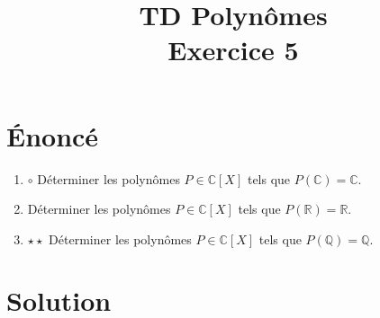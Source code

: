 \documentclass[french]{article}
\title{TD  Polynômes\\ Exercice 5}
\date{}
\newcommand{\Q}{\mathbb{Q}}
\newcommand{\R}{\mathbb{R}}
\newcommand{\C}{\mathbb{C}}
\begin{document}
\maketitle

\section{Énoncé}
\begin{enumerate}
	\item $\circ$ Déterminer les polynômes $P\in\C[X]$ tels que $P(\C)=\C$.
	\item Déterminer les polynômes $P\in\C[X]$ tels que $P(\R)=\R$.
	\item $\star\star$ Déterminer les polynômes $P\in\C[X]$ tels que $P(\Q)=\Q$.
\end{enumerate}
\section{Solution}
\end{document}
